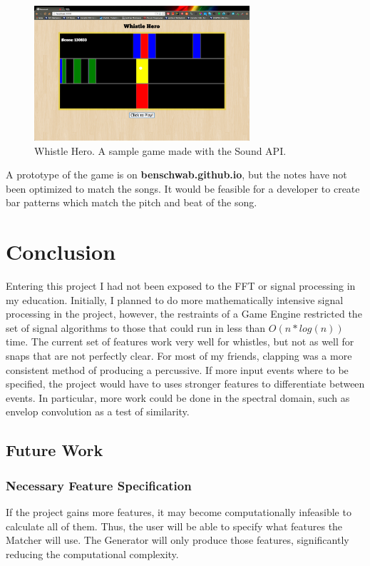 \documentclass[DIV=calc, paper=a4, fontsize=11pt, twocolumn]{scrartcl}   %
\begin{document}
    \begin{figure}[h]
   \centering
   \includegraphics[width=80mm]{figures/whistlehero.png}
   \caption{Whistle Hero. A sample game made with the Sound API.}
   \label{overflow}
   \end{figure}

   \par A prototype of the game is on \textbf{benschwab.github.io}, but the notes have not been optimized to match the songs. It would be feasible for a developer to create bar patterns which match the pitch and beat of the song.

\section{Conclusion}
   Entering this project I had not been exposed to the FFT or signal processing in my education. Initially, I planned to do more mathematically intensive signal processing in the project, however, the restraints of a Game Engine restricted the set of signal algorithms to those that could run in less than $O(n*log(n))$ time. The current set of features work very well for whistles, but not as well for snaps that are not perfectly clear. For most of my friends, clapping was a more consistent method of producing a percussive. If more input events where to be specified, the project would have to uses stronger features to differentiate between events. In particular, more work could be done in the spectral domain, such as envelop convolution as a test of similarity.
   \subsection{Future Work}
   \subsubsection{Necessary Feature Specification}
  If the project gains more features, it may become computationally infeasible to calculate all of them. Thus, the user will be able to specify what features the Matcher will use. The Generator will only produce those features, significantly reducing the computational complexity.
\end{document}
